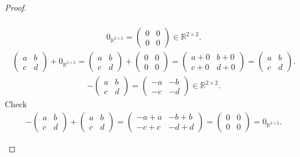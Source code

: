 \documentclass{amsart}
\newcommand{\bbr}{\mathbb{R}}
\newcommand{\aaa}{\left(\begin{smallmatrix}a&b\\c&d\end{smallmatrix}\right)}
\theoremstyle{plain}
\theoremstyle{definition}
\begin{document}
\begin{proof}
\begin{enumerate}[(a)]
\begin{align*}
	    	\end{align*}
	    	\begin{align*}
	    	0_{\bbr^{2\times 2}} = \left(\begin{smallmatrix}0&0\\0&0\end{smallmatrix}\right) \in \bbr^{2\times 2}.
	    	\end{align*}
			\begin{align*}
	        \aaa + 0_{\bbr^{2\times 2}} = \aaa + \left(\begin{smallmatrix}0&0\\0&0\end{smallmatrix}\right) = \left(\begin{smallmatrix}a+0&b+0\\c+0&d+0\end{smallmatrix}\right) = \aaa.
			\end{align*}
			\begin{align*}
			-\aaa = \left(\begin{smallmatrix}-a&-b\\-c&-d\end{smallmatrix}\right) \in \bbr^{2\times 2}.
			\end{align*}
			Check
			\begin{align*}
			-\aaa+\aaa = \left(\begin{smallmatrix}-a+a&-b+b\\-c+c&-d+d\end{smallmatrix}\right) = \left(\begin{smallmatrix}0&0\\0&0\end{smallmatrix}\right) = 0_{\bbr^{2\times 2}}.
		    \end{align*}


\end{enumerate}
\end{proof}
\end{document}
